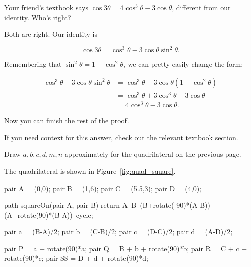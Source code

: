 \documentclass[../key.tex]{subfiles}
\begin{document}
\begin{outer_problem}
\item Your friend's textbook says $\cos 3\theta = 4\cos^3\theta - 3\cos \theta$, different from our identity. Who's right?
\end{outer_problem}

Both are right. Our identity is

$$\cos 3\theta = \cos^3\theta - 3\cos\theta\sin^2\theta.$$

Remembering that $\sin^2\theta = 1-\cos^2\theta$, we can pretty easily change the form:

\begin{align*}
\cos^3\theta - 3\cos\theta\sin^2\theta &= \cos^3\theta - 3\cos\theta(1-\cos^2\theta) \\
&= \cos^3\theta + 3\cos^3\theta - 3\cos\theta \\
&= 4\cos^3\theta - 3\cos\theta.
\end{align*}

\begin{outer_problem}
\item Now you can finish the rest of the proof.
\end{outer_problem}

If you need context for this answer, check out the relevant textbook section.

\begin{inner_problem}[start=1]
\item Draw $a,b,c,d,m,n$ approximately for the quadrilateral on the previous page.
\end{inner_problem}

The quadrilateral is shown in Figure~\ref{fig:quad_square}.

\begin{asydef}
pair A = (0,0);
pair B = (1,6);
pair C = (5.5,3);
pair D = (4,0);

path squareOn(pair A, pair B) {
	return A--B--(B+rotate(-90)*(A-B))--(A+rotate(90)*(B-A))--cycle;
}

pair a = (B-A)/2;
pair b = (C-B)/2;
pair c = (D-C)/2;
pair d = (A-D)/2;

pair P = a + rotate(90)*a;
pair Q = B + b + rotate(90)*b;
pair R = C + c + rotate(90)*c;
pair SS = D + d + rotate(90)*d;
\end{asydef}
\end{document}
